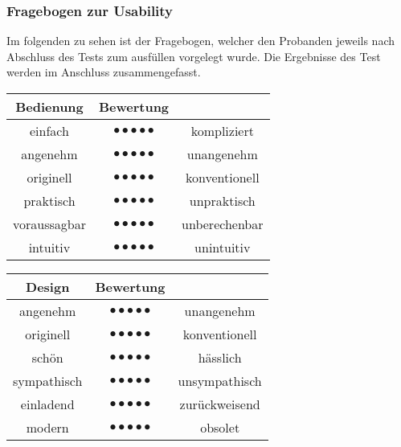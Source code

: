 \subsubsection*{Fragebogen zur Usability}
Im folgenden zu sehen ist der Fragebogen, welcher den Probanden jeweils nach
Abschluss des Tests zum ausfüllen vorgelegt wurde. Die Ergebnisse des Test
werden im Anschluss zusammengefasst.

\begin{center}
  \begin{tabular}{ c c c }
    \toprule
    \textbf{Bedienung} & \textbf{Bewertung} &  \\ \midrule
    einfach &$ \bullet\bullet\bullet\bullet\bullet$ & kompliziert \\ \midrule
    angenehm &$ \bullet\bullet\bullet\bullet\bullet$ & unangenehm \\  \midrule
    originell &$ \bullet\bullet\bullet\bullet\bullet$ & konventionell \\ \midrule
    praktisch &$ \bullet\bullet\bullet\bullet\bullet$ & unpraktisch \\ \midrule
    voraussagbar &$ \bullet\bullet\bullet\bullet\bullet$ & unberechenbar \\ \midrule
    intuitiv &$ \bullet\bullet\bullet\bullet\bullet$ & unintuitiv \\
    \bottomrule
  \end{tabular}
\end{center}

\begin{center}
  \begin{tabular}{ c c c }
    \toprule
    \textbf{Design} & \textbf{Bewertung} &  \\ \midrule
    angenehm &$ \bullet\bullet\bullet\bullet\bullet$ & unangenehm \\ \midrule
    originell &$ \bullet\bullet\bullet\bullet\bullet$ & konventionell \\  \midrule
    schön &$ \bullet\bullet\bullet\bullet\bullet$ & hässlich \\ \midrule
    sympathisch &$ \bullet\bullet\bullet\bullet\bullet$ & unsympathisch \\ \midrule
    einladend &$ \bullet\bullet\bullet\bullet\bullet$ & zurückweisend \\ \midrule
    modern &$ \bullet\bullet\bullet\bullet\bullet$ & obsolet \\
    \bottomrule
  \end{tabular}
\end{center}
\vspace{1cm}

